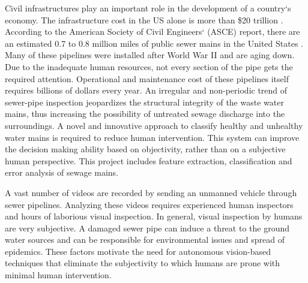 \documentclass[letterpaper,12pt, onecolumn]{article}%
\begin{document}
Civil infrastructures play an important role in the development of a country`s economy. The infrastructure cost in the US alone is more than \$20 trillion \cite{iyer2013automated}. According to the American Society of Civil Engineers` (ASCE) report, there are an estimated 0.7 to 0.8 million miles of public sewer mains in the United States \cite{asce2013}. Many of these pipelines were installed after World War II and are aging down. Due to the inadequate human resources, not every section of the pipe gets the required attention. Operational and maintenance cost of these pipelines itself requires billions of dollars every year. An irregular and non-periodic trend of sewer-pipe inspection jeopardizes the structural integrity of the waste water mains, thus increasing the possibility of untreated sewage discharge into the surroundings. A novel and innovative approach to classify healthy and unhealthy water mains is required to reduce human intervention. This system can improve the decision making ability based on objectivity, rather than on a subjective human perspective. This project includes feature extraction, classification and error analysis of sewage mains.

A vast number of videos are recorded by sending an unmanned vehicle through sewer pipelines. Analyzing these videos requires experienced human inspectors and hours of laborious visual inspection. In general, visual inspection by humans are very subjective. A damaged sewer pipe can induce a threat to the ground water sources and can be responsible for environmental issues and spread of epidemics. These factors motivate the need for autonomous vision-based techniques that eliminate the subjectivity to which humans are prone with minimal human intervention. 
\end{document}
